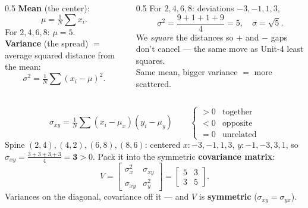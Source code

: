 \documentclass[aspectratio=169, 11pt]{beamer}
\begin{document}
\begin{frame}[t, plain]
  \begin{columns}[T]
    \begin{column}{0.5\textwidth}
      \textbf{Mean} (the center):
      \[ \mu=\tfrac1N\textstyle\sum x_i. \]
      For $2,4,6,8$: $\mu=5$.\\[8pt]
      \textbf{Variance} (the spread) $=$ average squared distance from the mean:
      \[ \sigma^2=\tfrac1N\textstyle\sum (x_i-\mu)^2. \]
    \end{column}
    \begin{column}{0.5\textwidth}
      For $2,4,6,8$: deviations $-3,-1,1,3$,
      \[ \sigma^2=\frac{9+1+1+9}{4}=5,\quad \sigma=\sqrt5. \]
      \vspace{2pt}
      We \emph{square} the distances so $+$ and $-$ gaps don't cancel --- the same move as Unit-4 least squares.\\[6pt]
      Same mean, bigger variance $=$ more scattered.
    \end{column}
  \end{columns}
\end{frame}

\begin{frame}[t, plain]
  \[ \sigma_{xy}=\tfrac1N\textstyle\sum (x_i-\mu_x)(y_i-\mu_y)
     \qquad \begin{cases}>0 & \text{together}\\ <0 & \text{opposite}\\ =0 & \text{unrelated}\end{cases} \]
  Spine $(2,4),(4,2),(6,8),(8,6)$: centered $x:-3,-1,1,3$, $y:-1,-3,3,1$, so
  $\sigma_{xy}=\tfrac{3+3+3+3}{4}=\mathbf{3}>0$. Pack it into the symmetric \textbf{covariance matrix}:
  \[ V=\begin{bmatrix}\sigma_x^2 & \sigma_{xy}\\ \sigma_{xy} & \sigma_y^2\end{bmatrix}
      =\begin{bmatrix}5 & 3\\ 3 & 5\end{bmatrix}. \]
  \vspace{-2pt}
  Variances on the diagonal, covariance off it --- and $V$ is \textbf{symmetric} ($\sigma_{xy}=\sigma_{yx}$).
\end{frame}
\end{document}
